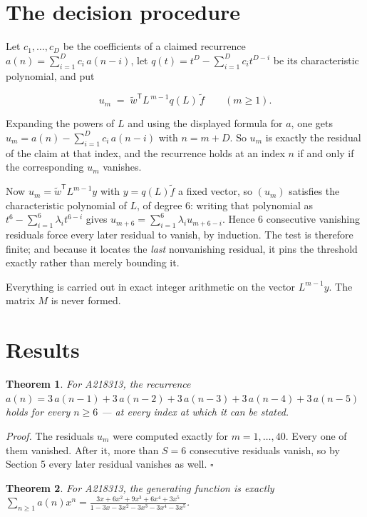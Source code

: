 \documentclass[11pt]{article}
\newtheorem{theorem}{Theorem}
\theoremstyle{definition}
\begin{document}
\section{The decision procedure}

Let $c_1,\dots,c_D$ be the coefficients of a claimed recurrence $a(n) = \sum_{i=1}^{D} c_i\,a(n-i)$, let $q(t) = t^{D} - \sum_{i=1}^{D} c_i t^{D-i}$ be its characteristic polynomial, and put

\[u_m \;=\; \tilde w^{\mathsf T} L^{\,m-1} q(L)\,\tilde f \qquad (m \ge 1).\]

Expanding the powers of $L$ and using the displayed formula for $a$, one gets $u_m = a(n) - \sum_{i=1}^{D} c_i\,a(n-i)$ with $n = m + D$. So $u_m$ is exactly the residual of the claim at that index, and the recurrence holds at an index $n$ if and only if the corresponding $u_m$ vanishes.

Now $u_m = \tilde w^{\mathsf T} L^{m-1} y$ with $y = q(L)\tilde f$ a fixed vector, so $(u_m)$ satisfies the characteristic polynomial of $L$, of degree $6$: writing that polynomial as $t^{6} - \sum_{i=1}^{6} \lambda_i t^{6-i}$ gives $u_{m+6} = \sum_{i=1}^{6} \lambda_i u_{m+6-i}$. Hence $6$ consecutive vanishing residuals force every later residual to vanish, by induction. The test is therefore finite; and because it locates the {\itshape last} nonvanishing residual, it pins the threshold exactly rather than merely bounding it.

Everything is carried out in exact integer arithmetic on the vector $L^{m-1}y$. The matrix $M$ is never formed.

\section{Results}

\begin{theorem} For A218313, the recurrence $a(n) = 3\,a(n-1) + 3\,a(n-2) + 3\,a(n-3) + 3\,a(n-4) + 3\,a(n-5)$ holds for every $n \ge 6$ --- at every index at which it can be stated.\end{theorem}

{\itshape Proof.} The residuals $u_m$ were computed exactly for $m = 1,\dots,40$. Every one of them vanished. After it, more than $S = 6$ consecutive residuals vanish, so by Section 5 every later residual vanishes as well. $\square$

\begin{theorem} For A218313, the generating function is exactly $\sum_{n\ge 1} a(n)x^n = \frac{3x + 6x^{2} + 9x^{3} + 6x^{4} + 3x^{5}}{1 - 3x - 3x^{2} - 3x^{3} - 3x^{4} - 3x^{5}}$.\end{theorem}
\end{document}
